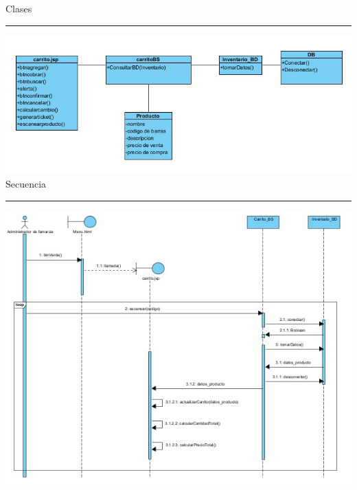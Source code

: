 {
\begin{flushleft}
	\newpage
	\Large{Clases}\\
	\rule{14cm}{0.5pt}

	\includegraphics[width=14cm]{casouso/cu1.1.2/images/clases.jpg}\\	

	\newpage
	\Large{Secuencia}\\
	\rule{14cm}{0.5pt}

	\includegraphics[width=14cm]{casouso/cu1.1.2/images/secuencia.jpg}\\	
	
\end{flushleft}
}